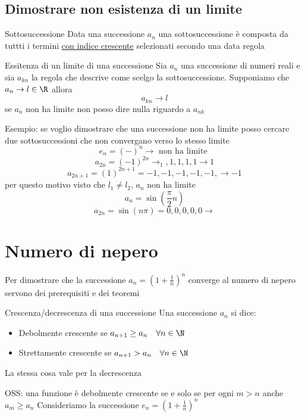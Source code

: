 \subsection{Dimostrare non esistenza di un limite}
\begin{definizione}{Sottosuccessione}
	Data una successione $a_n$ una sottosuccessione è composta da tuttti i termini \underline{con indice crescente} selezionati secondo una data regola
\end{definizione}
\begin{teorema}{Essitenza di un limite di una successione}
	Sia $a_n$ una successione di numeri reali e sia $a_{kn}$ la regola che descrive come scelgo la sottosuccessione. Supponiamo che $a_n \to l \in  \R$ allora
	\[
		a_{kn} \to l
	\]
	se $a_n$ non ha limite non posso dire nulla riguardo a $a_{nk}$

\end{teorema}

Esempio:
se voglio dimostrare che una successione non ha limite posso cercare due sottosuccessioni che non convergano verso lo stesso limite
\[
	e_n = \left( - \right) ^{n} \rightarrow \text{ non ha limite }
\]
\[
	a_{2n}=\left( -1 \right) ^{2n} \rightarrow_1,1,1,1,1 \rightarrow 1
\]
\[
	a_{2n+1}= \left( 1 \right) ^{2n+1} = -1,-1,-1,-1,-1, \rightarrow -1
\]
per questo motivo visto che $l_1 \neq l_2$, $a_n$ non ha limite
\[
	a_n=\sin\left( \frac{\pi}{2}n \right)
\]
\[
	a_{2n}= \sin\left( n \pi  \right) = 0,0,0,0,0 \rightarrow
\]

\section{Numero di nepero}
Per dimostrare che la successione $a_n = \left( 1+ \frac{1}{n} \right) ^{n}$ converge al numero di nepero servono dei prerequisiti e dei teoremi

\begin{definizione}{Crescenza/decrescenza di una successione
	}
	Una successione $a_n$ si dice:
	\begin{itemize}
		\item Debolmente crescente se \quad $a_{n+1} \ge a_n \quad \forall n \in  \N$
		\item Strettamente crescente se \quad $a_{n+1} > a_n \quad \forall n \in  \N$
	\end{itemize}
	La stessa cosa vale per la decrescenza
\end{definizione}

OSS: una funzione è debolmente crescente se e solo se per ogni $m >n$ anche $a_m \ge a_n$
Consideriamo la successione $e_n = \left( 1+ \frac{1}{n} \right) ^{n}$

